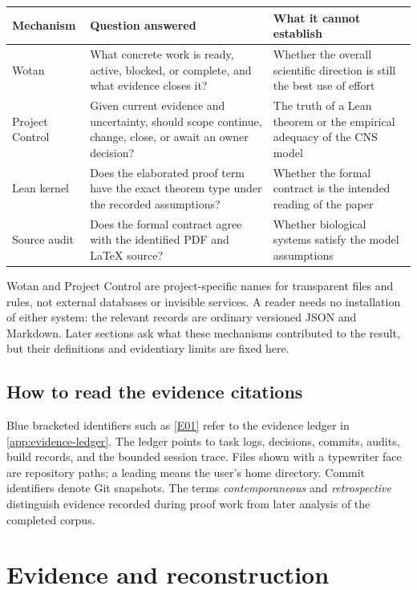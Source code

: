 \documentclass[11pt,a4paper]{article}
\newcommand{\artifact}[1]{\texttt{\detokenize{#1}}}
\newcommand{\ev}[1]{%
  \hyperref[ev:#1]{\textcolor{ReportBlue}{\textsf{\scriptsize[#1]}}}}
\begin{document}
\begin{center}
\small
\begin{tabularx}{\linewidth}{@{}L{31mm}L{39mm}Y@{}}
\toprule
\textbf{Mechanism} & \textbf{Question answered} & \textbf{What it cannot establish} \\
\midrule
Wotan & What concrete work is ready, active, blocked, or complete, and what
evidence closes it? & Whether the overall scientific direction is still the best
use of effort \\
Project Control & Given current evidence and uncertainty, should scope continue,
change, close, or await an owner decision? & The truth of a Lean theorem or the
empirical adequacy of the CNS model \\
Lean kernel & Does the elaborated proof term have the exact theorem type under the
recorded assumptions? & Whether the formal contract is the intended reading of the
paper \\
Source audit & Does the formal contract agree with the identified PDF and LaTeX
source? & Whether biological systems satisfy the model assumptions \\
\bottomrule
\end{tabularx}
\end{center}

Wotan and Project Control are project-specific names for transparent files and
rules, not external databases or invisible services. A reader needs no installation
of either system: the relevant records are ordinary versioned JSON and Markdown.
Later sections ask what these mechanisms contributed to the result, but their
definitions and evidentiary limits are fixed here.

\subsection{How to read the evidence citations}

Blue bracketed identifiers such as \ev{E01} refer to the evidence ledger in
\cref{app:evidence-ledger}. The ledger points to task logs, decisions, commits,
audits, build records, and the bounded session trace. Files shown with a typewriter
face are repository paths; a leading \artifact{~/} means the user's home directory.
Commit identifiers denote Git snapshots. The terms \emph{contemporaneous} and
\emph{retrospective} distinguish evidence recorded during proof work from later
analysis of the completed corpus.

\section{Evidence and reconstruction}
\label{sec:evidence}
\end{document}

